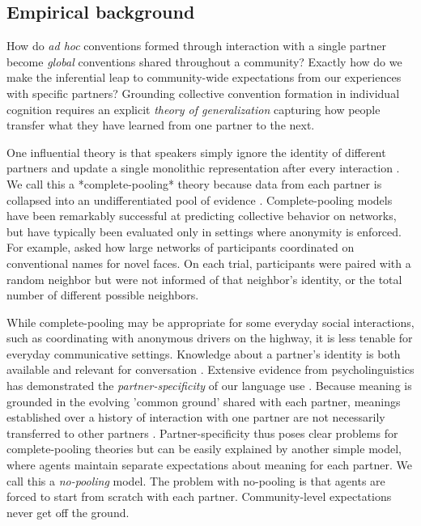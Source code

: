 
\subsection{Empirical background}
How do \emph{ad hoc} conventions formed through interaction with a single partner become \emph{global} conventions shared throughout a community?
Exactly how do we make the inferential leap to community-wide expectations from our experiences with specific partners? 
Grounding collective convention formation in individual cognition requires an explicit \emph{theory of generalization} capturing how people transfer what they have learned from one partner to the next.

One influential theory is that speakers simply ignore the identity of different partners and update a single monolithic representation after every interaction \cite{steels_self-organizing_1995,barr_establishing_2004,young_evolution_2015}.
We call this a *complete-pooling* theory because data from each partner is collapsed into an undifferentiated pool of evidence \cite{gelman2006data}. 
Complete-pooling models have been remarkably successful at predicting collective behavior on networks, but have typically been evaluated only in settings where anonymity is enforced. 
For example,  asked how large networks of participants coordinated on conventional names for novel faces.
On each trial, participants were paired with a random neighbor but were not informed of that neighbor's identity, or the total number of different possible neighbors. 

While complete-pooling may be appropriate for some everyday social interactions, such as coordinating with anonymous drivers on the highway, it is less tenable for everyday communicative settings.
Knowledge about a partner's identity is both available and relevant for conversation \cite{eckert_three_2012, davidson_nice_1986}.
Extensive evidence from psycholinguistics has demonstrated the \emph{partner-specificity} of our language use \cite{clark_using_1996}. 
Because meaning is grounded in the evolving 'common ground' shared with each partner, meanings established over a history of interaction with one partner are not necessarily transferred to other partners \cite{wilkes-gibbs_coordinating_1992,metzing_when_2003}.
Partner-specificity thus poses clear problems for complete-pooling theories but can be easily explained by another simple model, where agents maintain separate expectations about meaning for each partner.
We call this a \emph{no-pooling} model.
The problem with no-pooling is that agents are forced to start from scratch with each partner.
Community-level expectations never get off the ground.

